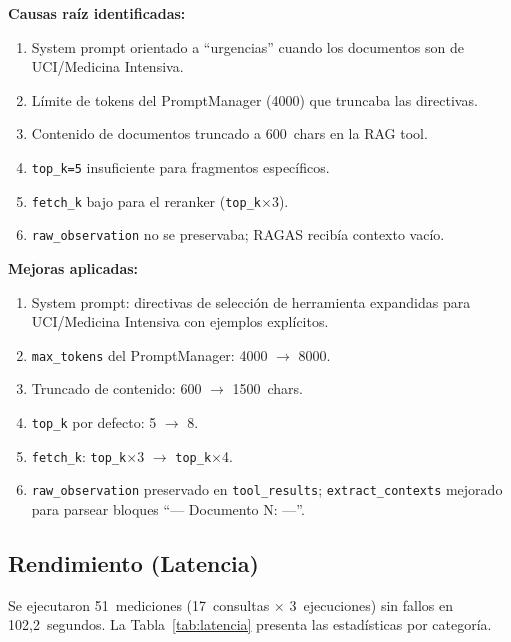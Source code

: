 \documentclass[11pt,a4paper,twocolumn]{article}
\begin{document}
\begin{tcolorbox}[
  colback=lightbg, colframe=ragcolor!60,
  title={\footnotesize\bfseries Causas ra\'{i}z y mejoras aplicadas al pipeline RAG},
  fonttitle=\color{white}, coltitle=white,
  fontupper=\footnotesize, breakable
]
\textbf{Causas ra\'{i}z identificadas:}
\begin{enumerate}[nosep, leftmargin=*, label=\arabic*.]
  \item System prompt orientado a ``urgencias'' cuando los documentos son de UCI/Medicina Intensiva.
  \item L\'{i}mite de tokens del PromptManager (4000) que truncaba las directivas.
  \item Contenido de documentos truncado a 600~chars en la RAG tool.
  \item \texttt{top\_k=5} insuficiente para fragmentos espec\'{i}ficos.
  \item \texttt{fetch\_k} bajo para el reranker (\texttt{top\_k}$\times$3).
  \item \texttt{raw\_observation} no se preservaba; RAGAS recib\'{i}a contexto vac\'{i}o.
\end{enumerate}
\textbf{Mejoras aplicadas:}
\begin{enumerate}[nosep, leftmargin=*, label=\arabic*.]
  \item System prompt: directivas de selecci\'{o}n de herramienta expandidas para UCI/Medicina Intensiva con ejemplos expl\'{i}citos.
  \item \texttt{max\_tokens} del PromptManager: 4000 $\rightarrow$ 8000.
  \item Truncado de contenido: 600 $\rightarrow$ 1500~chars.
  \item \texttt{top\_k} por defecto: 5 $\rightarrow$ 8.
  \item \texttt{fetch\_k}: \texttt{top\_k}$\times$3 $\rightarrow$ \texttt{top\_k}$\times$4.
  \item \texttt{raw\_observation} preservado en \texttt{tool\_results}; \texttt{extract\_contexts} mejorado para parsear bloques ``--- Documento N: ---''.
\end{enumerate}
\end{tcolorbox}

\subsection{Rendimiento (Latencia)}

Se ejecutaron 51~mediciones (17~consultas $\times$ 3~ejecuciones) sin fallos en 102,2~segundos. La Tabla~\ref{tab:latencia} presenta las estad\'{i}sticas por categor\'{i}a.
\end{document}
